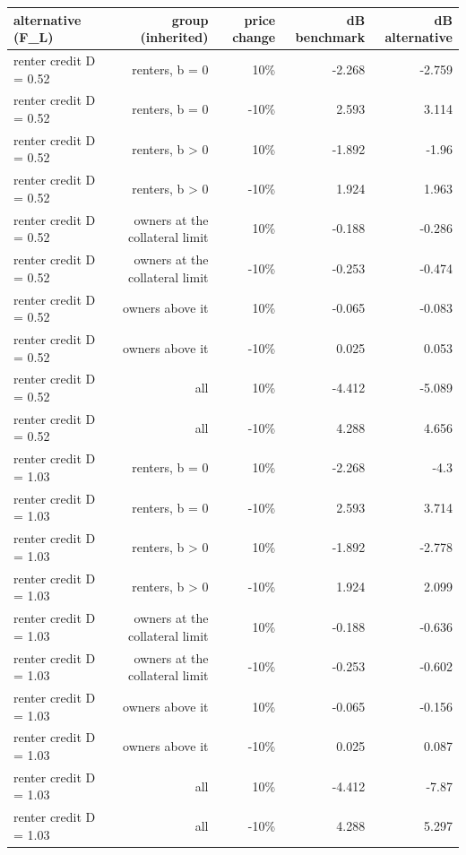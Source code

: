 \begin{tabular}{lrrrr}
\toprule
alternative (F\_L) & group (inherited) & price change & dB benchmark & dB alternative \\
\midrule
renter credit D = 0.52 & renters, b = 0 & 10\% & -2.268 & -2.759 \\
renter credit D = 0.52 & renters, b = 0 & -10\% & 2.593 & 3.114 \\
renter credit D = 0.52 & renters, b > 0 & 10\% & -1.892 & -1.96 \\
renter credit D = 0.52 & renters, b > 0 & -10\% & 1.924 & 1.963 \\
renter credit D = 0.52 & owners at the collateral limit & 10\% & -0.188 & -0.286 \\
renter credit D = 0.52 & owners at the collateral limit & -10\% & -0.253 & -0.474 \\
renter credit D = 0.52 & owners above it & 10\% & -0.065 & -0.083 \\
renter credit D = 0.52 & owners above it & -10\% & 0.025 & 0.053 \\
renter credit D = 0.52 & all & 10\% & -4.412 & -5.089 \\
renter credit D = 0.52 & all & -10\% & 4.288 & 4.656 \\
renter credit D = 1.03 & renters, b = 0 & 10\% & -2.268 & -4.3 \\
renter credit D = 1.03 & renters, b = 0 & -10\% & 2.593 & 3.714 \\
renter credit D = 1.03 & renters, b > 0 & 10\% & -1.892 & -2.778 \\
renter credit D = 1.03 & renters, b > 0 & -10\% & 1.924 & 2.099 \\
renter credit D = 1.03 & owners at the collateral limit & 10\% & -0.188 & -0.636 \\
renter credit D = 1.03 & owners at the collateral limit & -10\% & -0.253 & -0.602 \\
renter credit D = 1.03 & owners above it & 10\% & -0.065 & -0.156 \\
renter credit D = 1.03 & owners above it & -10\% & 0.025 & 0.087 \\
renter credit D = 1.03 & all & 10\% & -4.412 & -7.87 \\
renter credit D = 1.03 & all & -10\% & 4.288 & 5.297 \\
\bottomrule
\end{tabular}
